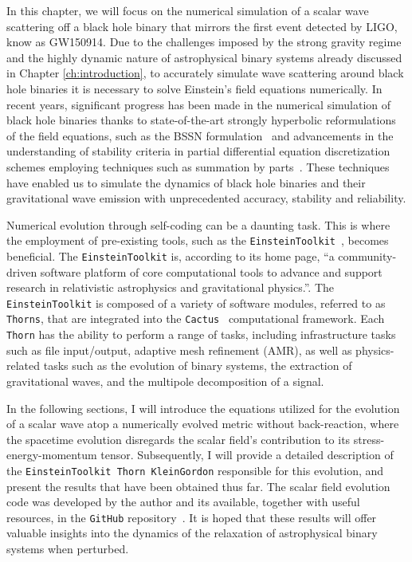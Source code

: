 In this chapter, we will focus on the numerical simulation of a scalar wave scattering off a black hole binary that mirrors the first event detected by LIGO, know as GW150914. Due to the challenges imposed by the strong gravity regime and the highly dynamic nature of astrophysical binary systems already discussed in Chapter \ref{ch:introduction}, to accurately simulate wave scattering around black hole binaries it is necessary to solve Einstein's field equations numerically. In recent years, significant progress has been made in the numerical simulation of black hole binaries thanks to state-of-the-art strongly hyperbolic reformulations of the field equations, such as the BSSN formulation~\cite{PhysRevD.52.5428,PhysRevD.59.024007} and advancements in the understanding of stability criteria in partial differential equation discretization schemes employing techniques such as summation by parts~\cite{Diener2007}. These techniques have enabled us to simulate the dynamics of black hole binaries and their gravitational wave emission with unprecedented accuracy, stability and reliability.

Numerical evolution through self-coding can be a daunting task. This is where the employment of pre-existing tools, such as the \texttt{EinsteinToolkit}~\cite{EinsteinToolkit:2022_11}, becomes beneficial. The \texttt{EinsteinToolkit} is, according to its home page, ``a community-driven software platform of core computational tools to advance and support research in relativistic astrophysics and gravitational physics.''. The \texttt{EinsteinToolkit} is composed of a variety of software modules, referred to as \texttt{Thorns}, that are integrated into the \texttt{Cactus}~\cite{Goodale:2002a} computational framework. Each \texttt{Thorn} has the ability to perform a range of tasks, including infrastructure tasks such as file input/output, adaptive mesh refinement (AMR), as well as physics-related tasks such as the evolution of binary systems, the extraction of gravitational waves, and the multipole decomposition of a signal.

In the following sections, I will introduce the equations utilized for the evolution of a scalar wave atop a numerically evolved metric without back-reaction, where the spacetime evolution disregards the scalar field's contribution to its stress-energy-momentum tensor. Subsequently, I will provide a detailed description of the \texttt{EinsteinToolkit Thorn KleinGordon} responsible for this evolution, and present the results that have been obtained thus far. The scalar field evolution code was developed by the author and its available, together with useful resources, in the \texttt{GitHub} repository~\cite{FieldPerturbationsRepo}. It is hoped that these results will offer valuable insights into the dynamics of the relaxation of astrophysical binary systems when perturbed.